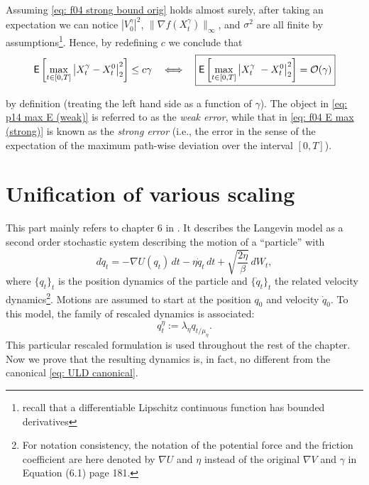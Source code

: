 \documentclass[12pt]{article}
\begin{document}
\begin{remark}
Assuming \eqref{eq: f04 strong bound orig} holds almost surely, after taking an expectation we can notice  $|V_0^\gamma|^2$, $\|\nabla f(X_t^\gamma)\|_{\infty}$, and $\sigma^2$ are all finite by assumptions\footnote{recall that a differentiable Lipschitz continuous function has bounded derivatives}.
Hence, by redefining $c$ we conclude that
\begin{equation}
\label{eq: f04 E max (strong)}
    {\mathsf E}\left[\max_{t\in[0, T]}\left|X_t^{\gamma} - X_t^0\right|_2^2\right] \le c\gamma\quad\Longleftrightarrow\quad\boxed{
    {\mathsf E}\left[ \max_{t \in [0, T]} \left|X_t^{\gamma}\ - X_t^0\right|_2^2 \right] = \mathcal{O}(\gamma)
    }
\end{equation}
\end{remark}
by definition (treating the left hand side as a function of $\gamma$).
The object in \eqref{eq: p14 max E (weak)} is referred to as the \emph{weak error}, while that in \eqref{eq: f04 E max (strong)} is known as the \emph{strong error} (i.e., the error in the sense of the expectation of the maximum path-wise deviation over the interval $[0, T]$).

\section{Unification of various scaling}

This part mainly refers to chapter 6 in \cite{p14}.
It describes the Langevin model as a second order stochastic system describing the motion of a ``particle'' with
\[
d\dot{q}_t = -\nabla U(q_t)\,dt - \eta \dot{q}_t\,dt + \sqrt{\frac{2\eta}{\beta}}\,dW_t,
\]
where $\{q_t\}_t$ is the position dynamics of the particle and $\{\dot{q}_t\}_t$ the related velocity dynamics\footnote{For notation consistency, the notation of the potential force and the friction coefficient are here denoted by $\nabla U$ and $\eta$ instead of the original $\nabla V$ and $\gamma$ in Equation (6.1) page 181.}.
Motions are assumed to start at the position $q_0$ and velocity $\dot{q}_0$. To this model, the family of rescaled dynamics is associated:
\[
q_t^{\eta} := \lambda_{\eta} q_{t/\mu_{\eta}}.
\]
This particular rescaled formulation is used throughout the rest of the chapter.\\

Now we prove that the resulting dynamics is, in fact, no different from the canonical \eqref{eq: ULD canonical}.
\end{document}
